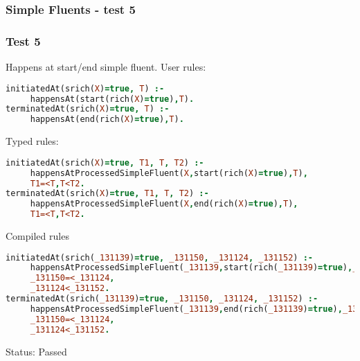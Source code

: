 \documentclass[8pt]{beamer}
\begin{document}
\begin{frame}[fragile]
\frametitle{Simple Fluents - test 5}
\subsubsection{Test 5}
\small
Happens at start/end simple fluent.\linebreak
User rules:
\begin{tiny}
\begin{lstlisting}[language=Prolog]
initiatedAt(srich(X)=true, T) :-
     happensAt(start(rich(X)=true),T).
terminatedAt(srich(X)=true, T) :-
     happensAt(end(rich(X)=true),T).
\end{lstlisting}
\end{tiny}
Typed rules:
\begin{tiny}
\begin{lstlisting}[language=Prolog]
initiatedAt(srich(X)=true, T1, T, T2) :-
     happensAtProcessedSimpleFluent(X,start(rich(X)=true),T),
     T1=<T,T<T2.
terminatedAt(srich(X)=true, T1, T, T2) :-
     happensAtProcessedSimpleFluent(X,end(rich(X)=true),T),
     T1=<T,T<T2.
\end{lstlisting}
\end{tiny}
Compiled rules
\begin{tiny}
\begin{lstlisting}[language=Prolog]
initiatedAt(srich(_131139)=true, _131150, _131124, _131152) :-
     happensAtProcessedSimpleFluent(_131139,start(rich(_131139)=true),_131124),
     _131150=<_131124,
     _131124<_131152.
terminatedAt(srich(_131139)=true, _131150, _131124, _131152) :-
     happensAtProcessedSimpleFluent(_131139,end(rich(_131139)=true),_131124),
     _131150=<_131124,
     _131124<_131152.
\end{lstlisting}
\end{tiny}
Status: Passed
\end{frame}
\end{document}
